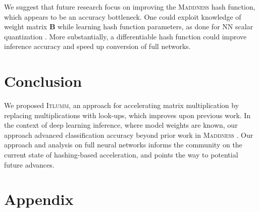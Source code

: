 \documentclass{article}
\begin{document}
We suggest that future research focus on improving the \textsc{Maddness} hash function, which appears to be an accuracy bottleneck.
One could exploit knowledge of weight matrix $\bm{B}$ while learning hash function parameters, as done for NN scalar quantization \cite{stock2020and}.
More substantially, a differentiable hash function could improve inference accuracy and speed up conversion of full networks.

\section{Conclusion}

We proposed \textsc{Itlumm}, an approach for accelerating matrix multiplication by replacing multiplications with look-ups, which improves upon previous work.
In the context of deep learning inference, where model weights are known, our approach advanced classification accuracy beyond prior work in \textsc{Maddness} \citep{blalock2021a}.
Our approach and analysis on full neural networks informs the community on the current state of hashing-based acceleration, and points the way to potential future advances.
\clearpage
%



\iffalse 
\clearpage
\newpage
\appendix

\section{Appendix}
\end{document}
